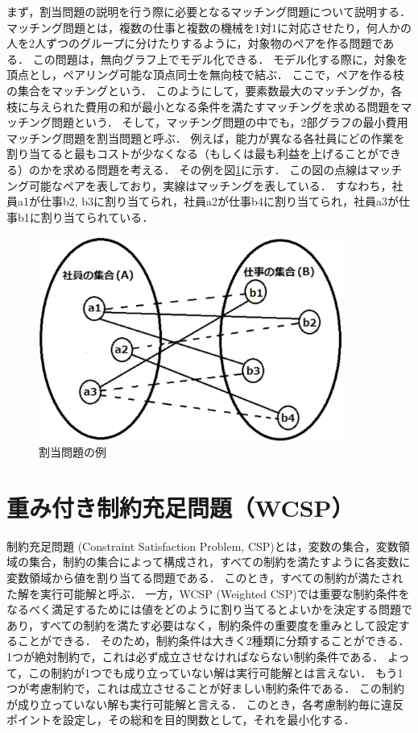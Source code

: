 まず，割当問題の説明を行う際に必要となるマッチング問題について説明する．
マッチング問題とは，複数の仕事と複数の機械を1対1に対応させたり，何人かの人を2人ずつのグループに分けたりするように，対象物のペアを作る問題である．
この問題は，無向グラフ上でモデル化できる．
モデル化する際に，対象を頂点とし，ペアリング可能な頂点同士を無向枝で結ぶ．
ここで，ペアを作る枝の集合をマッチングという．
このようにして，要素数最大のマッチングか，各枝に与えられた費用の和が最小となる条件を満たすマッチングを求める問題をマッチング問題という．
そして，マッチング問題の中でも，2部グラフの最小費用マッチング問題を割当問題\cite{ハンドブック}と呼ぶ．
例えば，能力が異なる各社員にどの作業を割り当てると最もコストが少なくなる（もしくは最も利益を上げることができる）のかを求める問題を考える．
その例を図\ref{fig:wariate}に示す．
この図の点線はマッチング可能なペアを表しており，実線はマッチングを表している．
すなわち，社員a1が仕事b2, b3に割り当てられ，社員a2が仕事b4に割り当てられ，社員a3が仕事b1に割り当てられている\cite{ハンドブック}．
\begin{figure}[h]
\centering
\includegraphics[width=10cm, clip]{wariate.eps}
\caption{割当問題の例}
\label{fig:wariate}
\end{figure}



\section{重み付き制約充足問題（WCSP）}

制約充足問題 (Constraint Satisfaction Problem, CSP)とは，変数の集合，変数領域の集合，制約の集合によって構成され，すべての制約を満たすように各変数に変数領域から値を割り当てる問題である．
このとき，すべての制約が満たされた解を実行可能解と呼ぶ．
一方，WCSP (Weighted CSP)\cite{CSP}では重要な制約条件をなるべく満足するためには値をどのように割り当てるとよいかを決定する問題であり，すべての制約を満たす必要はなく，制約条件の重要度を重みとして設定することができる．
そのため，制約条件は大きく2種類に分類することができる．
1つが絶対制約で，これは必ず成立させなければならない制約条件である．
よって，この制約が1つでも成り立っていない解は実行可能解とは言えない．
もう1つが考慮制約で，これは成立させることが好ましい制約条件である．
この制約が成り立っていない解も実行可能解と言える．
このとき，各考慮制約毎に違反ポイントを設定し，その総和を目的関数として，それを最小化する．


